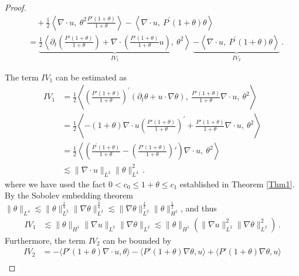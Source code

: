 \documentclass[reqno,11pt]{amsart}
\numberwithin{equation}{section}
\begin{document}
\begin{proof}
\begin{equation*}
\begin{aligned}
& \quad + \frac{1}{2}\left\langle  \nabla \cdot u,\ \theta^2 \frac{P'(1+\theta)}{1+\theta} \right\rangle - \left\langle\nabla\cdot u,\ P^\prime(1+\theta)\theta \right\rangle \\
& = \underset{IV_1}{\underbrace{\frac{1}{2} \left\langle \partial_t \left( \frac{P'(1+\theta)}{1+\theta} \right) + \nabla \cdot \left( \frac{P'(1+\theta)}{1+\theta} u \right),\ \theta^2 \right\rangle }} \ \underset{IV_2}{\underbrace{ - \left\langle  \nabla\cdot u,\ P^\prime ( 1 + \theta ) \theta \right\rangle}} \,.
\end{aligned}
\end{equation*}

The term $IV_1$ can be estimated as
\begin{equation*}
\begin{aligned}
IV_1&= \frac{1}{2}\left\langle\left( \frac{P'(1+\theta)}{1+\theta}\right)^\prime (\partial_t \theta + u \cdot \nabla \theta),\ \frac{P'(1+\theta)}{1+\theta} \nabla \cdot u,\ \theta^2 \right\rangle \\&
= \frac{1}{2}\left\langle -(1+\theta) \nabla \cdot u \left( \frac{P'(1+\theta)}{1+\theta} \right)^\prime + \frac{P'(1+\theta)}{1+\theta} \nabla \cdot u,\ \theta^2 \right\rangle \\&
= \frac{1}{2}\left\langle \left( \frac{P^\prime(1+\theta)}{1+\theta} - \left( \frac{P'(1+\theta)}{1+\theta} \right)' \right) \nabla \cdot u,\ \theta^2 \right\rangle \\&
\lesssim \| \nabla\cdot u \|_{L^2} \|\theta\|^2_{L^4} \,.
\end{aligned}
\end{equation*}
where we have used the fact $0<c_0\leq 1+\theta\leq c_1$ established in Theorem \ref{Thm1}. By the Sobolev embedding theorem $\|\theta\|_{L^4}\lesssim\|\theta\|^{\frac{1}{4}}_{L^2}\|\nabla\theta\|^{\frac{3}  {4}}_{L^2}\lesssim\|\nabla\theta\|^{\frac{1}{2}}_{L^2}\|\theta\|^{\frac{1}{2}}_{H^1}$, and thus
\begin{equation}\label{nd5}
\begin{aligned}
IV_1&\lesssim\|\theta\|_{H^1}\|\nabla u\|_{L^2}\|\nabla\theta\|_{L^2}\lesssim\|\theta\|_{H^1}(\|\nabla u\|^2_{L^2}\|\nabla\theta\|^2_{L^2})
 \,.
\end{aligned}
\end{equation}
Furthermore, the term $IV_2$ can be bounded by
\begin{equation}\label{nd52}
\begin{aligned}
IV_2&= -\langle P'(1+\theta)\nabla\cdot u, \theta\rangle - \langle P'(1+\theta)\nabla\theta, u\rangle + \langle P'(1+\theta)\nabla\theta, u\rangle \\

\end{aligned}
\end{equation}
\end{proof}
\end{document}
